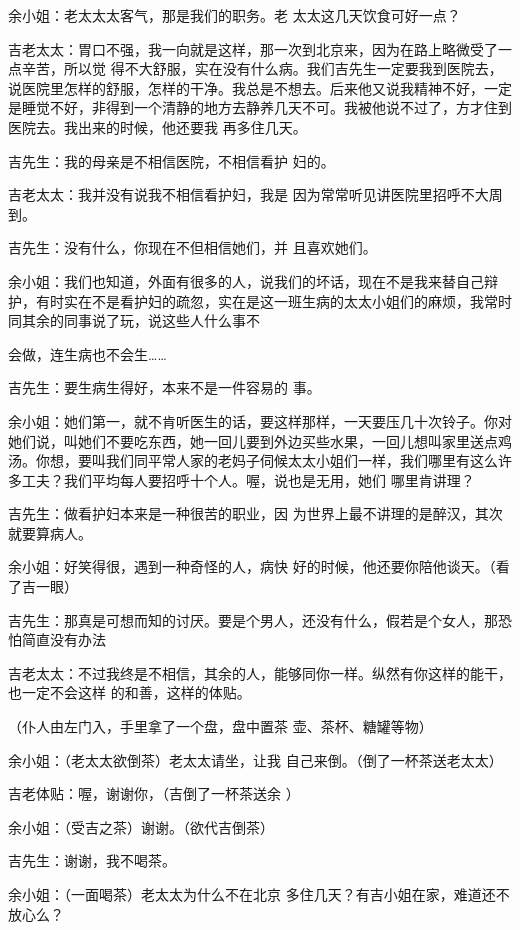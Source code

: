 \documentclass{article}
\begin{document}
余小姐：老太太太客气，那是我们的职务。老
太太这几天饮食可好一点？ 

吉老太太：胃口不强，我一向就是这样，那一次到北京来，因为在路上略微受了一点辛苦，所以觉
\newpage
得不大舒服，实在没有什么病。我们吉先生一定要我到医院去，说医院里怎样的舒服，怎样的干净。我总是不想去。后来他又说我精神不好，一定是睡觉不好，非得到一个清静的地方去静养几天不可。我被他说不过了，方才住到医院去。我出来的时候，他还要我
再多住几天。 

吉先生：我的母亲是不相信医院，不相信看护
妇的。 

吉老太太：我并没有说我不相信看护妇，我是
因为常常听见讲医院里招呼不大周到。 

吉先生：没有什么，你现在不但相信她们，并
且喜欢她们。 

余小姐：我们也知道，外面有很多的人，说我们的坏话，现在不是我来替自己辩护，有时实在不是看护妇的疏忽，实在是这一班生病的太太小姐们的麻烦，我常时同其余的同事说了玩，说这些人什么事不

\newpage
会做，连生病也不会生…… 

吉先生：要生病生得好，本来不是一件容易的
事。 

余小姐：她们第一，就不肯听医生的话，要这样那样，一天要压几十次铃子。你对她们说，叫她们不要吃东西，她一回儿要到外边买些水果，一回儿想叫家里送点鸡汤。你想，要叫我们同平常人家的老妈子伺候太太小姐们一样，我们哪里有这么许多工夫？我们平均每人要招呼十个人。喔，说也是无用，她们
哪里肯讲理？ 

吉先生：做看护妇本来是一种很苦的职业，因
为世界上最不讲理的是醉汉，其次就要算病人。 

余小姐：好笑得很，遇到一种奇怪的人，病快
好的时候，他还要你陪他谈天。（看了吉一眼） 

吉先生：那真是可想而知的讨厌。要是个男人，还没有什么，假若是个女人，那恐怕简直没有办法

\newpage

吉老太太：不过我终是不相信，其余的人，能够同你一样。纵然有你这样的能干，也一定不会这样
的和善，这样的体贴。 

（仆人由左门入，手里拿了一个盘，盘中置茶
壶、茶杯、糖罐等物） 


余小姐：（老太太欲倒茶）老太太请坐，让我
自己来倒。（倒了一杯茶送老太太） 

吉老体贴：喔，谢谢你，（吉倒了一杯茶送余
） 

余小姐：（受吉之茶）谢谢。（欲代吉倒茶）


吉先生：谢谢，我不喝茶。 

余小姐：（一面喝茶）老太太为什么不在北京
多住几天？有吉小姐在家，难道还不放心么？ 
\end{document}
